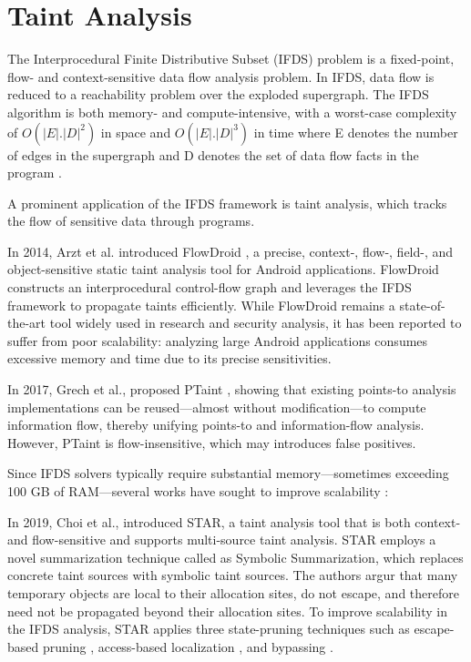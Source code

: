 \section{Taint Analysis}

The Interprocedural Finite Distributive Subset (IFDS) problem is a fixed-point, flow- and context-sensitive data flow analysis problem. 
In IFDS, data flow is reduced to a reachability problem over the exploded supergraph. The IFDS algorithm is both memory- and compute-intensive, with a worst-case complexity of
$O(|E| . |D|^2)$ in space and $O(|E| . |D|^3)$ in time where E denotes the number of edges in the supergraph and D denotes the set of data flow facts in the program \cite{reps1995precise}.

A prominent application of the IFDS framework is taint analysis, which tracks the flow of sensitive data through programs.

In 2014, Arzt et al. introduced FlowDroid \cite{arzt2014flowdroid}, a precise, context-, flow-, field-, and object-sensitive static taint analysis tool for Android applications. FlowDroid constructs an interprocedural control-flow graph and leverages the IFDS framework to propagate taints efficiently. 
While FlowDroid remains a state-of-the-art tool widely used in research and security analysis, it has been reported to suffer from poor scalability: 
analyzing large Android applications consumes excessive memory and time due to its precise sensitivities. \cite{li2021scaling}

In 2017, Grech et al., proposed PTaint \cite{grech2017p}, showing that existing points-to analysis implementations can be reused—almost without modification—to compute information flow, thereby unifying points-to and information-flow analysis. 
However, PTaint is flow-insensitive, which may introduces false positives.

Since IFDS solvers typically require substantial memory—sometimes exceeding 100 GB of RAM—several works have sought to improve scalability \cite{li2021scaling}:

In 2019, Choi et al., \cite{choi2019scalable} introduced STAR, a taint analysis tool that is both context- and flow-sensitive and supports multi-source taint analysis.
STAR employs a novel summarization technique called as Symbolic Summarization, which replaces concrete taint sources with symbolic taint sources.
The authors argur that many temporary objects are local to their allocation sites, do not escape, and therefore need not be propagated beyond their allocation sites.
To improve scalability in the IFDS analysis, STAR applies three state-pruning techniques such as escape-based pruning \cite{choi1999escape}, access-based localization \cite{oh2011access}, and bypassing \cite{oh2011access}.

